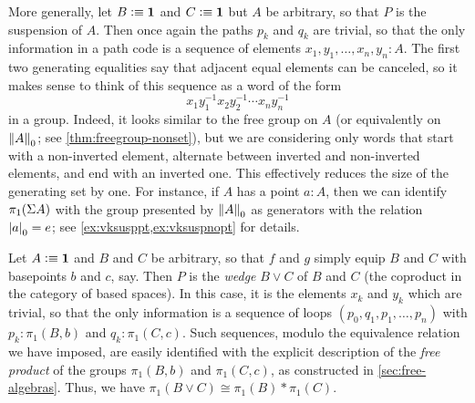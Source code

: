\documentclass[hott-all.tex]{subfiles}
\begin{document}
% 
% 
\begin{eg}
  More generally, let $B\defeq\unit$ and $C\defeq \unit$ but $A$ be arbitrary, so that $P$ is the suspension of $A$.
  Then once again the paths $p_k$ and $q_k$ are trivial, so that the only information in a path code is a sequence of elements $x_1,y_1,\dots,x_n,y_n: A$.
  The first two generating equalities say that adjacent equal elements can be canceled, so it makes sense to think of this sequence as a word of the form
  \[ x_1 y_1^{-1} x_2 y_2^{-1} \cdots x_n y_n^{-1} \]
  in a group.
  Indeed, it looks similar to the free group on $A$ (or equivalently on $\trunc0A$; see \cref{thm:freegroup-nonset}), but we are considering only words that start with a non-inverted element, alternate between inverted and non-inverted elements, and end with an inverted one.
  This effectively reduces the size of the generating set by one.
  For instance, if $A$ has a point $a:A$, then we can identify $\pi_1(\susp A)$ with the group presented by $\trunc0A$ as generators with the relation $\tproj0a = e$; see \cref{ex:vksusppt,ex:vksuspnopt} for details.
\end{eg}
% 
\begin{eg}
  Let $A\defeq\unit$ and $B$ and $C$ be arbitrary, so that $f$ and $g$ simply equip $B$ and $C$ with basepoints $b$ and $c$, say.
  Then $P$ is the \emph{wedge} $B\vee C$ of $B$ and $C$ (the coproduct in the category of based spaces).
  In this case, it is the elements $x_k$ and $y_k$ which are trivial, so that the only information is a sequence of loops $(p_0,q_1,p_1,\dots,p_n)$ with $p_k:\pi_1(B,b)$ and $q_k:\pi_1(C,c)$.
  Such sequences, modulo the equivalence relation we have imposed, are easily identified with the explicit description of the \emph{free product} of the groups $\pi_1(B,b)$ and $\pi_1(C,c)$, as constructed in \cref{sec:free-algebras}.
  Thus, we have $\pi_1(B\vee C) \cong \pi_1(B) * \pi_1(C)$.
\end{eg}
% 
% 
% 
% 
\end{document}
